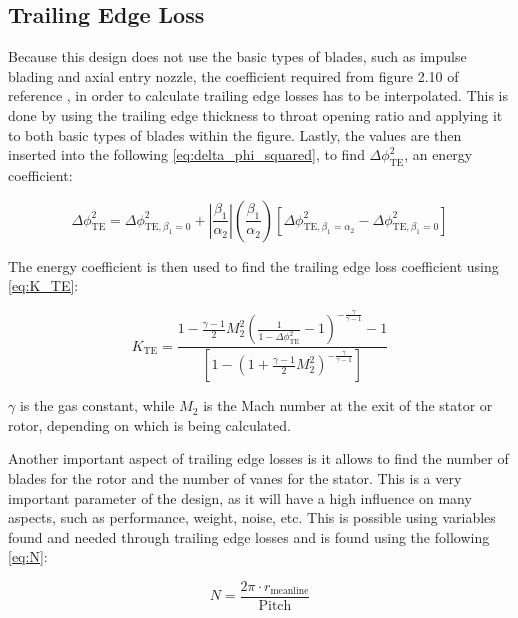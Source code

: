 \documentclass[12pt, letter]{report}
\begin{document}
\subsection{Trailing Edge Loss}

Because this design does not use the basic types of blades, such as impulse blading and axial entry nozzle, the coefficient required from figure 2.10 of reference \cite{moustapha2003}, in order to calculate trailing edge losses has to be interpolated. This is done by using the trailing edge thickness to throat opening ratio and applying it to both basic types of blades within the figure. Lastly, the values are then inserted into the following \autoref{eq:delta_phi_squared}, to find $\Delta\phi^{2}_{\text{TE}}$, an energy coefficient:

\begin{equation}
\label{eq:delta_phi_squared}
\Delta\phi^{2}_{\text{TE}} = \Delta\phi^{2}_{\text{TE}, \beta_1 = 0} + \left| \frac{\beta_1}{\alpha_2} \right| \left( \frac{\beta_1}{\alpha_2} \right) \left[ \Delta\phi^{2}_{\text{TE}, \beta_1 = \alpha_2} - \Delta\phi^{2}_{\text{TE}, \beta_1 = 0} \right]
\end{equation}

The energy coefficient is then used to find the trailing edge loss coefficient using \autoref{eq:K_TE}:

\begin{equation}
\label{eq:K_TE}
K_{\text{TE}} = \frac{1 - \frac{\gamma - 1}{2} M_2^2 \left( \frac{1}{1 - \Delta\phi^{2}_{\text{TE}}} - 1 \right)^{- \frac{\gamma}{\gamma - 1}} - 1}{\left[ 1 - \left( 1 + \frac{\gamma - 1}{2} M_2^2 \right)^{- \frac{\gamma}{\gamma - 1}} \right]}
\end{equation}

$\gamma$ is the gas constant, while $M_2$ is the Mach number at the exit of the stator or rotor, depending on which is being calculated.

Another important aspect of trailing edge losses is it allows to find the number of blades for the rotor and the number of vanes for the stator. This is a very important parameter of the design, as it will have a high influence on many aspects, such as performance, weight, noise, etc. This is possible using variables found and needed through trailing edge losses and is found using the following \autoref{eq:N}:

\begin{equation}
\label{eq:N}
N = \frac{2\pi \cdot r_{\text{meanline}}}{\text{Pitch}}
\end{equation}
\end{document}
